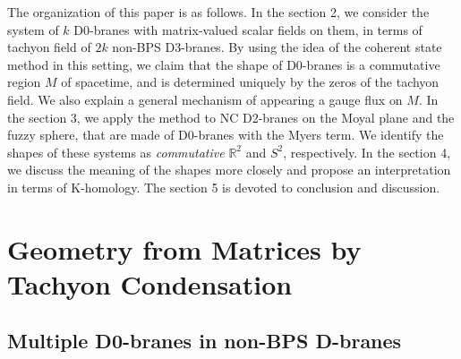 \documentclass[12pt]{article}
\numberwithin{equation}{section}
\def\real{\mathbb{R}}
\begin{document}
The organization of this paper is as follows. 
In the section 2, 
{we consider the system of $k$ D0-branes with matrix-valued scalar fields on them, in terms of tachyon field of $2k$ non-BPS D3-branes.}
By using the idea of the coherent state method {in this setting,} we claim that the %
{shape of D0-branes is a commutative region $M$ of spacetime, and} is determined uniquely by the zeros of the tachyon field.
We {also} explain a general mechanism of appearing a gauge flux {on $M$}.
In the section 3, we apply the method to 
{NC D2-branes on} the Moyal plane and the fuzzy sphere,
{that are made of D0-branes with the Myers term.}
We identify the shapes of these systems as {\it commutative} $\real^2$ and $S^2$, respectively.
In the section 4, we discuss
{the meaning of the shapes more closely and propose an interpretation
in terms of K-homology.}
The section 5 is devoted to conclusion and discussion. 





\section{Geometry from Matrices by Tachyon Condensation}

\subsection{Multiple D0-branes in non-BPS D-branes}
\end{document}
